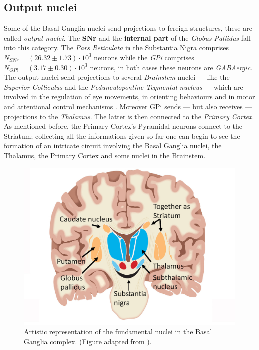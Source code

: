 \documentclass[MSc,english]{Container/thesistemplate}
\begin{document}
\subsection*{Output nuclei}
Some of the Basal Ganglia nuclei send projections to fereign structures, these are called \emph{output nuclei}. The \textbf{SNr} and the \textbf{internal part} of the \emph{Globus Pallidus} fall into this category. The \emph{Pars Reticulata} in the Substantia Nigra comprises $N_{SNr} = (26.32 \pm 1.73) \cdot 10^{3}$ neurons \cite{oorschot} while the \emph{GPi} comprises $N_{GPi} = (3.17 \pm 0.30) \cdot 10^{3}$ neurons, \cite{oorschot} in both cases these neurons are \emph{GABAergic}.
\\ The output nuclei send projections to several \emph{Brainstem} nuclei --- like the \emph{Superior Colliculus} and the \emph{Pedunculopontine Tegmental nucleus} --- which are involved in the regulation of eye movements, in orienting behaviours and in motor and attentional control mechanisms \cite{nelsonkreitzer}. Moreover GPi sends --- but also receives --- projections to the \emph{Thalamus}. The latter is then connected to the \emph{Primary Cortex}. 
\\ As mentioned before, the Primary Cortex's Pyramidal neurons connect to the Striatum; collecting all the informations given so far one can begin to see the formation of an intricate circuit involving the Basal Ganglia nuclei, the Thalamus, the Primary Cortex and some nuclei in the Brainstem.

\begin{figure}[ht!]
    \centering
    \includegraphics[scale=.3]{Images/bgnuclei.jpg}
    \caption{Artistic representation of the fundamental nuclei in the Basal Ganglia complex. (Figure adapted from \cite{bgnuclei}).}
    \label{fig:bgnuclei}
\end{figure}
\end{document}
